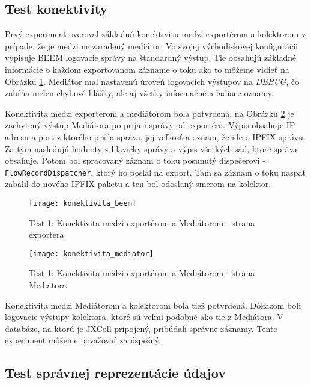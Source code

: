 
\subsection{Test konektivity}

Prvý experiment overoval základnú konektivitu medzi exportérom a kolektorom v prípade, že je medzi ne 
zaradený mediátor. Vo svojej východiskovej konfigurácii vypisuje BEEM logovacie správy na štandardný 
výstup. Tie obsahujú základné informácie o každom exportovanom zázname o toku ako to môžeme vidieť na 
Obrázku \ref{o:konektivita_beem}. Mediátor mal nastavenú úroveň logovacích výstupov na \emph{DEBUG}, 
čo zahŕňa nielen chybové hlášky, ale aj všetky informačné a ladiace oznamy. 

Konektivita medzi exportérom
a mediátorom bola potvrdená, na Obrázku \ref{o:konektivita_mediator} je zachytený výstup Mediátora po 
prijatí správy od exportéra. Výpis obsahuje IP adresu a port z ktorého prišla správa, jej veľkosť a 
oznam, že ide o IPFIX správu. Za tým nasledujú hodnoty z hlavičky správy a výpis všetkých sád, ktoré
správa obsahuje. Potom bol spracovaný záznam o toku posunutý dispečerovi - \verb|FlowRecordDispatcher|, 
ktorý ho poslal na export. Tam sa záznam o toku naspať zabalil do nového IPFIX paketu a ten bol odoslaný 
smerom na kolektor.

\begin{figure}[ht!]
\centering
\texttt{[image: konektivita\_beem]}
\caption{Test 1: Konektivita medzi exportérom a Mediátorom - strana exportéra}\label{o:konektivita_beem}
\end{figure}

\begin{figure}[ht!]
\centering
\texttt{[image: konektivita\_mediator]}
\caption{Test 1: Konektivita medzi exportérom a Mediátorom - strana Mediátora}\label{o:konektivita_mediator}
\end{figure}

Konektivita medzi Mediátorom a kolektorom bola tiež potvrdená. Dôkazom boli logovacie výstupy kolektora, 
ktoré sú veľmi podobné ako tie z Mediátora. V databáze, na ktorú je JXColl pripojený, pribúdali správne 
záznamy. Tento experiment môžeme považovať za úspešný.


\subsection{Test správnej reprezentácie údajov}

